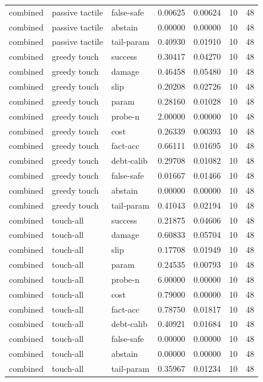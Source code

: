 \documentclass{article}
\begin{document}
\begin{center}
\begin{longtable}{lllllll}
combined & passive tactile & false-safe & 0.00625 & 0.00624 & 10 & 48 \\
combined & passive tactile & abstain & 0.00000 & 0.00000 & 10 & 48 \\
combined & passive tactile & tail-param & 0.40930 & 0.01910 & 10 & 48 \\
combined & greedy touch & success & 0.30417 & 0.04270 & 10 & 48 \\
combined & greedy touch & damage & 0.46458 & 0.05480 & 10 & 48 \\
combined & greedy touch & slip & 0.20208 & 0.02726 & 10 & 48 \\
combined & greedy touch & param & 0.28160 & 0.01028 & 10 & 48 \\
combined & greedy touch & probe-n & 2.00000 & 0.00000 & 10 & 48 \\
combined & greedy touch & cost & 0.26339 & 0.00393 & 10 & 48 \\
combined & greedy touch & fact-acc & 0.66111 & 0.01695 & 10 & 48 \\
combined & greedy touch & debt-calib & 0.29708 & 0.01082 & 10 & 48 \\
combined & greedy touch & false-safe & 0.01667 & 0.01466 & 10 & 48 \\
combined & greedy touch & abstain & 0.00000 & 0.00000 & 10 & 48 \\
combined & greedy touch & tail-param & 0.41043 & 0.02194 & 10 & 48 \\
combined & touch-all & success & 0.21875 & 0.04606 & 10 & 48 \\
combined & touch-all & damage & 0.60833 & 0.05704 & 10 & 48 \\
combined & touch-all & slip & 0.17708 & 0.01949 & 10 & 48 \\
combined & touch-all & param & 0.24535 & 0.00793 & 10 & 48 \\
combined & touch-all & probe-n & 6.00000 & 0.00000 & 10 & 48 \\
combined & touch-all & cost & 0.79000 & 0.00000 & 10 & 48 \\
combined & touch-all & fact-acc & 0.78750 & 0.01817 & 10 & 48 \\
combined & touch-all & debt-calib & 0.40921 & 0.01684 & 10 & 48 \\
combined & touch-all & false-safe & 0.00000 & 0.00000 & 10 & 48 \\
combined & touch-all & abstain & 0.00000 & 0.00000 & 10 & 48 \\
combined & touch-all & tail-param & 0.35967 & 0.01234 & 10 & 48 \\
\bottomrule
\end{longtable}
\renewcommand{\arraystretch}{1.0}
\end{center}
\end{document}
